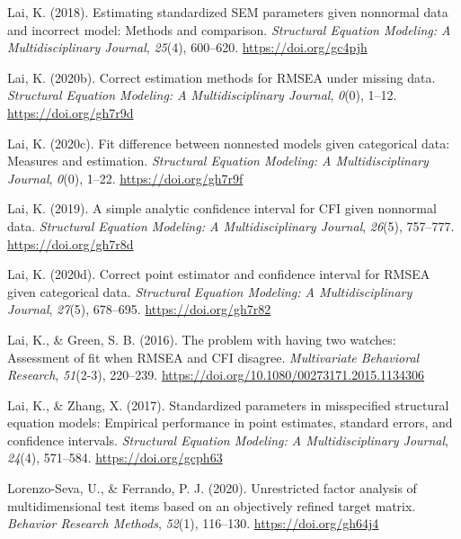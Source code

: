 \documentclass[11pt]{umnthesis}
\newlength{\cslhangindent}
\newenvironment{CSLReferences}[2] %
 {%
  \setlength{\parindent}{0pt}
  \ifodd #1 \everypar{\setlength{\hangindent}{\cslhangindent}}\ignorespaces\fi
  \ifnum #2 > 0
  \setlength{\parskip}{#2\baselineskip}
  \fi
 }%
 {}
\begin{document}
\begin{CSLReferences}{1}{0}
\leavevmode{}%
Lai, K. (2018). Estimating standardized {SEM} parameters given nonnormal data and incorrect model: {Methods} and comparison. \emph{Structural Equation Modeling: A Multidisciplinary Journal}, \emph{25}(4), 600--620. \url{https://doi.org/gc4pjh}

\leavevmode{}%
Lai, K. (2020b). Correct estimation methods for {RMSEA} under missing data. \emph{Structural Equation Modeling: A Multidisciplinary Journal}, \emph{0}(0), 1--12. \url{https://doi.org/gh7r9d}

\leavevmode{}%
Lai, K. (2020c). Fit difference between nonnested models given categorical data: {Measures} and estimation. \emph{Structural Equation Modeling: A Multidisciplinary Journal}, \emph{0}(0), 1--22. \url{https://doi.org/gh7r9f}

\leavevmode{}%
Lai, K. (2019). A simple analytic confidence interval for {CFI} given nonnormal data. \emph{Structural Equation Modeling: A Multidisciplinary Journal}, \emph{26}(5), 757--777. \url{https://doi.org/gh7r8d}

\leavevmode{}%
Lai, K. (2020d). Correct point estimator and confidence interval for {RMSEA} given categorical data. \emph{Structural Equation Modeling: A Multidisciplinary Journal}, \emph{27}(5), 678--695. \url{https://doi.org/gh7r82}

\leavevmode{}%
Lai, K., \& Green, S. B. (2016). The problem with having two watches: {Assessment} of fit when {RMSEA} and {CFI} disagree. \emph{Multivariate Behavioral Research}, \emph{51}(2-3), 220--239. \url{https://doi.org/10.1080/00273171.2015.1134306}

\leavevmode{}%
Lai, K., \& Zhang, X. (2017). Standardized parameters in misspecified structural equation models: {Empirical} performance in point estimates, standard errors, and confidence intervals. \emph{Structural Equation Modeling: A Multidisciplinary Journal}, \emph{24}(4), 571--584. \url{https://doi.org/gcph63}

\leavevmode{}%
Lorenzo-Seva, U., \& Ferrando, P. J. (2020). Unrestricted factor analysis of multidimensional test items based on an objectively refined target matrix. \emph{Behavior Research Methods}, \emph{52}(1), 116--130. \url{https://doi.org/gh64j4}


\end{CSLReferences}
\end{document}
